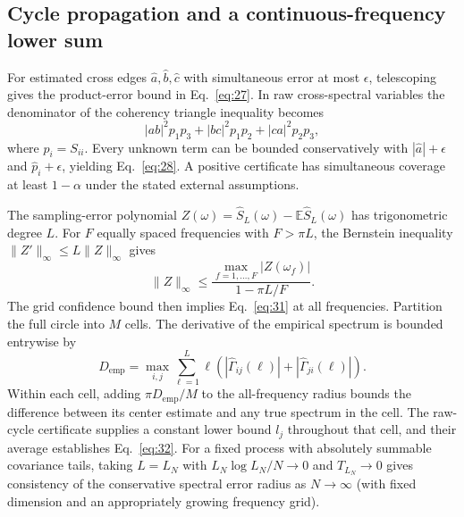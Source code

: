 \subsection{Cycle propagation and a continuous-frequency lower sum}
For estimated cross edges $\hat a,\hat b,\hat c$ with simultaneous error at most $\epsilon$, telescoping gives the product-error bound in Eq.~\eqref{eq:27}. In raw cross-spectral variables the denominator of the coherency triangle inequality becomes
\begin{equation}
 |ab|^2p_1p_3+|bc|^2p_1p_2+|ca|^2p_2p_3,
\end{equation}
where $p_i=S_{ii}$. Every unknown term can be bounded conservatively with $|\hat a|+\epsilon$ and $\hat p_i+\epsilon$, yielding Eq.~\eqref{eq:28}. A positive certificate has simultaneous coverage at least $1-\alpha$ under the stated external assumptions.

The sampling-error polynomial $Z(\omega)=\hat S_L(\omega)-\mathbb E\hat S_L(\omega)$ has trigonometric degree $L$. For $F$ equally spaced frequencies with $F>\pi L$, the Bernstein inequality $\|Z'\|_\infty\le L\|Z\|_\infty$ gives
\begin{equation}
 \|Z\|_\infty\le
 \frac{\max_{f=1,\ldots,F}|Z(\omega_f)|}{1-\pi L/F}.
\end{equation}
The grid confidence bound then implies Eq.~\eqref{eq:31} at all frequencies. Partition the full circle into $M$ cells. The derivative of the empirical spectrum is bounded entrywise by
\begin{equation}
 D_{\mathrm{emp}}=\max_{i,j}\sum_{\ell=1}^L
 \ell\left(|\hat\Gamma_{ij}(\ell)|+|\hat\Gamma_{ji}(\ell)|\right).
\end{equation}
Within each cell, adding $\pi D_{\mathrm{emp}}/M$ to the all-frequency radius bounds the difference between its center estimate and any true spectrum in the cell. The raw-cycle certificate supplies a constant lower bound $l_j$ throughout that cell, and their average establishes Eq.~\eqref{eq:32}. For a fixed process with absolutely summable covariance tails, taking $L=L_N$ with $L_N\log L_N/N\to0$ and $T_{L_N}\to0$ gives consistency of the conservative spectral error radius as $N\to\infty$ (with fixed dimension and an appropriately growing frequency grid).
